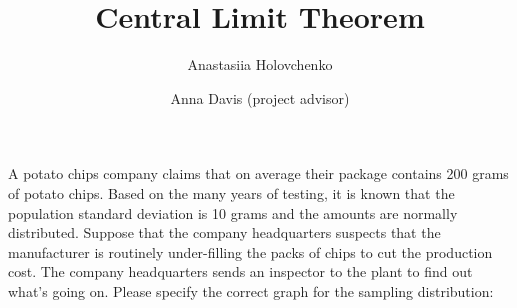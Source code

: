 \documentclass{ximera}
\author{Anastasiia Holovchenko \and Anna Davis (project advisor)} \title{Central Limit Theorem}
\begin{document}
\maketitle

\begin{example}
A potato chips company claims that on average their package contains 200 grams of potato chips. Based on the many years of testing, it is known that the population standard deviation is 10 grams and the amounts are normally distributed. Suppose that the company headquarters suspects that the manufacturer is routinely under-filling the packs of chips to cut the production cost. The company headquarters sends an inspector to the plant to find out what’s going on. Please specify the correct graph for the sampling distribution:

\begin{multipleChoice}  
\end{multipleChoice}
\end{example}
\end{document}

